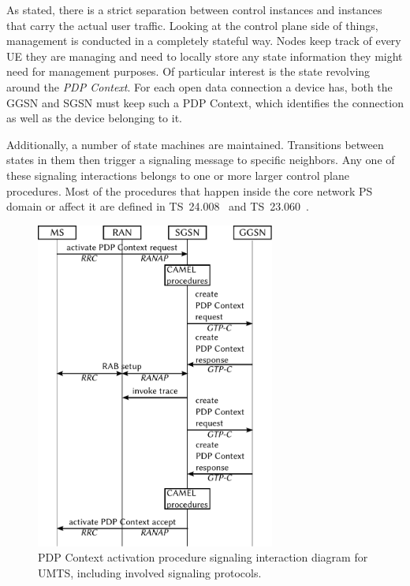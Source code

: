 As stated, there is a strict separation between control instances and instances that carry the actual user traffic. Looking at the control plane side of things, management is conducted in a completely stateful way. Nodes keep track of every \gls{UE} they are managing and need to locally store any state information they might need for management purposes. Of particular interest is the state revolving around the \textit{\gls{PDP} Context}. For each open data connection a device has, both the \gls{GGSN} and \gls{SGSN} must keep such a \gls{PDP} Context, which identifies the connection as well as the device belonging to it.

Additionally, a number of state machines are maintained. Transitions between states in them then trigger a signaling message to specific neighbors. Any one of these signaling interactions belongs to one or more larger control plane procedures. Most of the procedures that happen inside the core network \gls{PS} domain or affect it are defined in \gls{TS}~24.008~\cite{3gpp.24.008} and \gls{TS}~23.060~\cite{3gpp.23.060}.

\begin{figure}[htbp]
	\centering
	\includegraphics[width=0.7\textwidth]{images/pdp-context-activation-procedure.pdf}
	\caption{\acrshort{PDP} Context activation procedure signaling interaction diagram for \acrshort{UMTS}, including involved signaling protocols.}
\label{c4:fig:pdpcontextactivationinteraction}
\end{figure}

